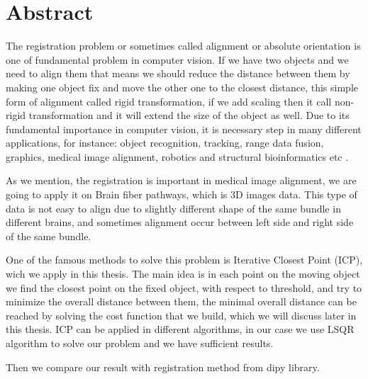 \documentclass[../structure.tex]{subfiles}
\begin{document}
\chapter{Abstract}
The registration problem or sometimes called alignment or absolute orientation is one of fundamental problem in computer vision. If we have two objects and we need to align them that means we should reduce the distance between them by making one object fix and move the other one to the closest distance, this simple form of alignment called rigid transformation, if we add scaling then it call non-rigid transformation and it will extend the size of the object as well. Due to its fundamental importance in computer vision, it is necessary step in many different applications, for instance: object recognition, tracking, range data fusion, graphics, medical image alignment, robotics and structural bioinformatics etc \cite{Li2007}.

As we mention, the registration is important in medical image alignment, we are going to apply it on Brain fiber pathways, which is 3D images data. This type of data is not easy to align due to slightly different shape of the same bundle in different brains, and sometimes alignment occur between left side and right side of the same bundle.

One of the famous methods to solve this problem is Iterative Closest Point (ICP), wich we apply in this thesis. The main idea is in each point on the moving object we find the closest point on the fixed object, with respect to threshold, and try to minimize the overall distance between them, the minimal overall distance can be reached by solving the cost function that we build, which we will discuss later in this thesis. ICP can be applied in different algorithms, in our case we use LSQR algorithm to solve our problem and we have sufficient results.

Then we compare our result with registration method from dipy library.
\end{document}
